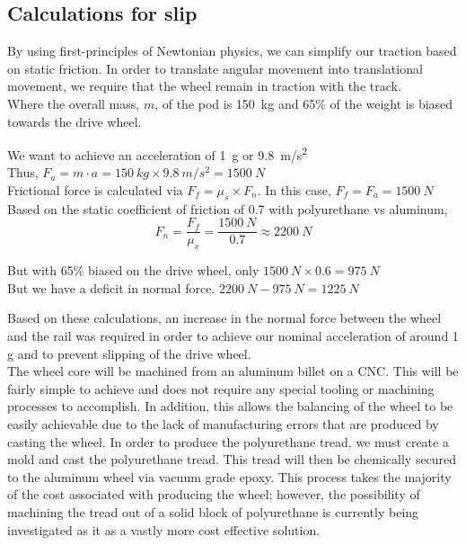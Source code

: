 \documentclass[main.tex]{subfiles}
\begin{document}
    \subsection{Calculations for slip}
    By using first-principles of Newtonian physics, we can simplify our traction based on static friction. In order to translate angular movement into translational movement, we require that the wheel remain in traction with the track.\\

    Where the overall mass, $m$, of the pod is \SI{150}{kg} and 65\% of the weight is biased towards the drive wheel.

    \begin{center}
        We want to achieve an acceleration of \SI{1}{g} or \SI{9.8}{m/s^2}\\

        Thus, $F_a=m\cdot a = \SI{150}{kg} \times \SI{9.8}{m/s^2} = \SI{1500}{N}$\\

        Frictional force is calculated via $F_f=\mu_s \times F_n$. In this case, $F_f=F_a=\SI{1500}{N}$\\

        Based on the static coefficient of friction of 0.7 with polyurethane vs aluminum,
        \[
        F_n = \frac{F_f}{\mu_s} = \frac{\SI{1500}{N}}{0.7} \approx \SI{2200}{N}
        \]

        But with 65\% biased on the drive wheel, only $\SI{1500}{N} \times 0.6 = \SI{975}{N}$\\

        But we have a deficit in normal force. $\SI{2200}{N} -\SI{975}{N}=\SI{1225}{N}$
    \end{center}
    Based on these calculations, an increase in the normal force between the wheel and the rail was required in order to achieve our nominal acceleration of around 1 g and to prevent slipping of the drive wheel.\\

    The wheel core will be machined from an aluminum billet on a CNC. This will be fairly simple to achieve and does not require any special tooling or machining processes to accomplish. In addition, this allows the balancing of the wheel to be easily achievable due to the lack of manufacturing errors that are produced by casting the wheel. In order to produce the polyurethane tread, we must create a mold and cast the polyurethane tread. This tread will then be chemically secured to the aluminum wheel via vacuum grade epoxy. This process takes the majority of the cost associated with producing the wheel; however, the possibility of machining the tread out of a solid block of polyurethane is currently being investigated as it as a vastly more cost effective solution.
\end{document}
